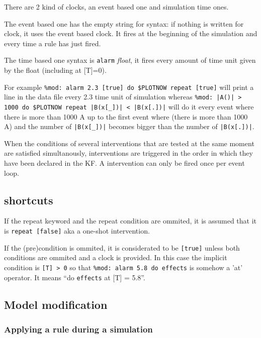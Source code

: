 \documentclass[11pt]{book}
\def\ttt#1{\texttt{#1}}
\begin{document}
There are 2 kind of clocks, an event based one and simulation time ones.

The event based one has the empty string for syntax: if nothing is
written for clock, it uses the event based clock. It fires at the
beginning of the simulation and every time a rule has just fired.

The time based one syntax is \ttt{alarm} \textit{float}, it fires
every amount of time unit given by the float (including at [T]=0).

For example
\lstinline[language=kappa]@%mod: alarm 2.3 [true] do $PLOTNOW repeat [true]@
will print a line in the data file every 2.3 time unit of
simulation whereas
\lstinline[language=kappa]@%mod: |A()| > 1000 do $PLOTNOW repeat |B(x[_])| < |B(x[.])|@
will do it every event where there is more than
1000 A up to the first event where (there is more than 1000 A) and
the number of \lstinline[language=kappa]@|B(x[_])|@ becomes bigger than the number of
\lstinline[language=kappa]@|B(x[.])|@.

When the conditions of several interventions that are tested at the
same moment are satisfied simultanously, interventions are triggered
in the order in which they have been declared in the KF. A intervention can only be fired once per event loop.

\subsection{shortcuts}
If the repeat keyword and the repeat condition are ommited, it is assumed that it is
\lstinline[language=kappa]!repeat [false]! aka a one-shot intervention.

If the (pre)condition is ommited, it is considerated to be
\lstinline[language=kappa]![true]! unless both conditions are ommited
and a clock is provided. In this case the implicit condition is
\lstinline[language=kappa]![T] > 0! so that
\lstinline[language=kappa]!%mod: alarm 5.8 do effects!
is somehow a 'at' operator. It means ``do \texttt{effects} at [T] = 5.8''.

\subsection{Model modification}
\subsubsection{Applying a rule during a simulation}
\end{document}
